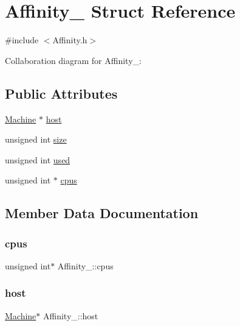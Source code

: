 \hypertarget{structAffinity__}{}\section{Affinity\+\_\+ Struct Reference}
\label{structAffinity__}


{\ttfamily \#include $<$Affinity.\+h$>$}



Collaboration diagram for Affinity\+\_\+\+:
\subsection*{Public Attributes}
\begin{DoxyCompactItemize}
\item 
\hyperlink{Machine_8h_aa3706f95e4706b9d02979efcabb1341d}{Machine} $\ast$ \hyperlink{structAffinity___ac4cdc9b9e9a1df4369bed2e6841bceb5}{host}
\item 
unsigned int \hyperlink{structAffinity___ab772334a1fd2e47a032a10db2a1e3064}{size}
\item 
unsigned int \hyperlink{structAffinity___afd246beb737889223e76a1717de24717}{used}
\item 
unsigned int $\ast$ \hyperlink{structAffinity___a8893fd89a2ffac8b79803c230a5cf4d0}{cpus}
\end{DoxyCompactItemize}


\subsection{Member Data Documentation}
\mbox{\label{structAffinity___a8893fd89a2ffac8b79803c230a5cf4d0}} 
\subsubsection{\texorpdfstring{cpus}{cpus}}
{\footnotesize\ttfamily unsigned int$\ast$ Affinity\+\_\+\+::cpus}

\mbox{\label{structAffinity___ac4cdc9b9e9a1df4369bed2e6841bceb5}} 
\subsubsection{\texorpdfstring{host}{host}}
{\footnotesize\ttfamily \hyperlink{Machine_8h_aa3706f95e4706b9d02979efcabb1341d}{Machine}$\ast$ Affinity\+\_\+\+::host}

